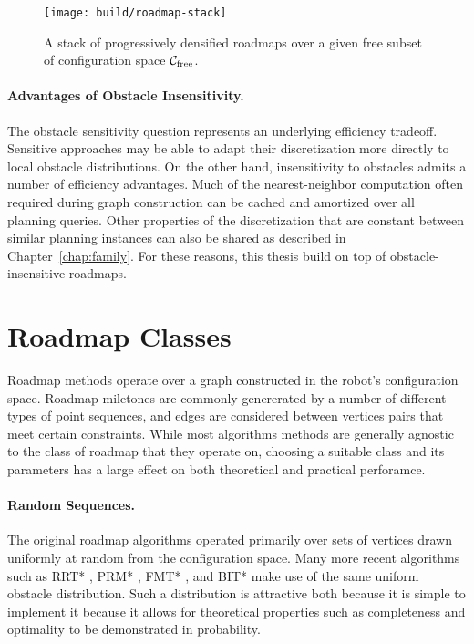 \begin{figure}
   \centering
   \texttt{[image: build/roadmap-stack]}
   \caption{A stack of progressively densified roadmaps
      over a given free subset of configuration space
      $\mathcal{C}_{\mbox{\scriptsize free}}$.}
\end{figure}

\paragraph{Advantages of Obstacle Insensitivity.}
The obstacle sensitivity question represents an underlying efficiency
tradeoff.
Sensitive approaches may be able to adapt their discretization more
directly to local obstacle distributions.
On the other hand,
insensitivity to obstacles admits a number of efficiency advantages.
Much of the nearest-neighbor computation
often required during graph construction can be cached and amortized
over all planning queries.
Other properties of the discretization that are constant between
similar planning instances can also be shared
as described in Chapter~\ref{chap:family}.
For these reasons,
this thesis build on top of obstacle-insensitive roadmaps.

\section{Roadmap Classes}
\label{sec:roadmaps:roadmap-classes}

Roadmap methods operate over a graph constructed in the
robot's configuration space.
Roadmap miletones are commonly genererated by a number of different
types of point sequences,
and edges are considered between vertices pairs that meet
certain constraints.
While most algorithms methods are generally agnostic
to the class of roadmap that they operate on,
choosing a suitable class and its parameters has a large effect
on both theoretical and practical perforamce.

\paragraph{Random Sequences.}
The original roadmap algorithms
\citep{kavrakietal1996prm}
operated primarily over sets
of vertices drawn uniformly at random from the configuration space.
Many more recent algorithms such as
RRT* \citep{karaman2010rrtstar},
PRM* \citep{karaman2011samplingoptimal},
FMT* \citep{janson2015fmtstar},
and BIT* \citep{gammell2015bitstar} make use of the same
uniform obstacle distribution.
Such a distribution is attractive both because
it is simple to implement
it because it allows for theoretical properties such as
completeness and optimality to be demonstrated
in probability.

